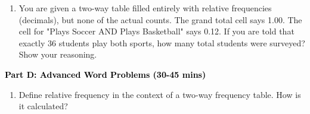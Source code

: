 \documentclass[12pt, letterpaper, fleqn]{article}
\newcommand{\blank}{\underline{\hspace{2.2cm}}}
\begin{document}
\vspace{3mm}

\begin{enumerate}[itemsep=5.5cm, leftmargin=0.6cm, resume]
\item You are given a two-way table filled entirely with relative frequencies (decimals), but none of the actual counts. The grand total cell says 1.00. The cell for "Plays Soccer AND Plays Basketball" says 0.12. If you are told that exactly 36 students play both sports, how many total students were surveyed? Show your reasoning.
\end{enumerate}

\newpage

\begin{tcolorbox}[colback=customteal!20]
\large\textcolor{black}{\textbf{Part D: Advanced Word Problems (30-45 mins)}}
\end{tcolorbox}

\vspace{3mm}

\begin{enumerate}[itemsep=5.5cm, leftmargin=0.6cm, resume]
\item Define relative frequency in the context of a two-way frequency table. How is it calculated? \blank
\end{enumerate}
\end{document}
